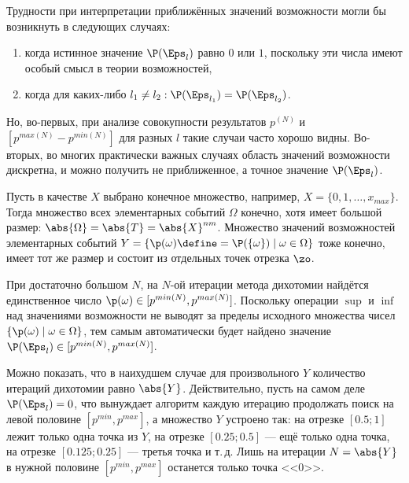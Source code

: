 Трудности при интерпретации приближённых значений возможности могли бы возникнуть в следующих случаях:
\begin{enumerate}
  \item когда истинное значение $\P(\Eps_l)$ равно $0$ или $1$, поскольку эти числа имеют особый смысл в теории возможностей,
  \item когда для каких-либо $l_1 \neq l_2: \P(\Eps_{l_1}) = \P(\Eps_{l_2})$.
\end{enumerate}

Но, во-первых, при анализе совокупности результатов $p^{(N)}$ и $[p^{max(N)} - p^{min(N)}]$ для разных $l$ такие случаи часто хорошо видны. Во-вторых, во многих практически важных случаях область значений возможности дискретна, и можно получить не приближенное, а точное значение $\P(\Eps_l)$. 

Пусть в качестве $X$ выбрано конечное множество, например, $X = \{0, 1, \ldots, x_{max}\}$. Тогда множество всех элементарных событий $\Omega$ конечно, хотя имеет большой размер: $\abs{\Omega}= \abs{T} = \abs{X}^{nm}$. Множество значений возможностей элементарных событий $Y = \{\p(\omega) \define= \P(\{\omega\})\mid\omega\in\Omega\}$ тоже конечно, имеет тот же размер и состоит из отдельных точек отрезка $\zo$. 

При достаточно большом $N$, на $N$-ой итерации метода дихотомии найдётся единственное число $\p(\omega)\in[p^{min(N)}, p^{max(N)}]$. Поскольку операции $\sup$ и $\inf$ над значениями возможности не выводят за пределы исходного множества чисел $\{\p(\omega) \mid\omega\in\Omega\}$, тем самым автоматически будет найдено значение $\P(\Eps_l) \in [p^{min(N)}, p^{max(N)}]$.  

Можно показать, что в наихудшем случае для произвольного $Y$ количество итераций дихотомии равно $\abs{Y}$. 
Действительно, пусть на самом деле $\P(\Eps_l) = 0$, что вынуждает алгоритм каждую итерацию продолжать поиск на левой половине $[p^{min}, p^{max}]$, а множество $Y$ устроено так: на отрезке $[0.5;  1]$ лежит только одна точка из $Y$, на отрезке $[0.25;  0.5]$ --- ещё только одна точка, на отрезке $[0.125;  0.25]$ --- третья точка и т.\,д. Лишь на итерации $N = \abs{Y}$ в нужной половине $[p^{min}, p^{max}]$ останется только точка <<$0$>>. 

